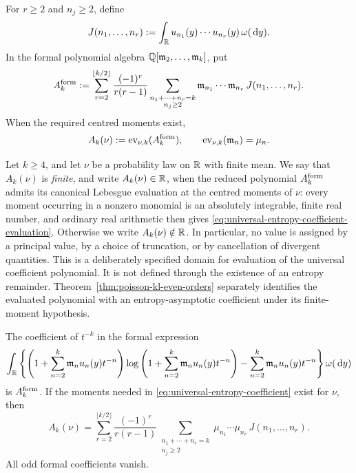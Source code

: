 For \(r\ge2\) and \(n_j\ge2\), define
\begin{equation}\label{eq:mode-integral-definition}
J(n_1,\ldots,n_r):=
\int_{\mathbb{R}}u_{n_1}(y)\cdots u_{n_r}(y)\,\omega(\,\mathrm{d} y).
\end{equation}
In the formal polynomial algebra
\(\mathbb{Q}[\mathfrak m_2,\ldots,\mathfrak m_k]\), put
\begin{equation}\label{eq:universal-entropy-coefficient}
A_k^{\rm form}:=
\sum_{r=2}^{\lfloor k/2\rfloor}
\frac{(-1)^r}{r(r-1)}
\sum_{\substack{n_1+\cdots+n_r=k\\ n_j\ge2}}
\mathfrak m_{n_1}\cdots\mathfrak m_{n_r}\,J(n_1,\ldots,n_r).
\end{equation}
When the required centred moments exist,
\begin{equation}\label{eq:universal-entropy-coefficient-evaluation}
A_k(\nu):=\operatorname{ev}_{\nu,k}(A_k^{\rm form}),
\qquad
\operatorname{ev}_{\nu,k}(\mathfrak m_n)=\mu_n .
\end{equation}

\begin{definition}
\label{def:canonical-coefficient-finiteness}
Let \(k\ge4\), and let \(\nu\) be a probability law on \(\mathbb{R}\) with finite
mean.  We say that \(A_k(\nu)\) is \emph{finite}, and write
\(A_k(\nu)\in\mathbb{R}\), when the reduced polynomial
\(A_k^{\rm form}\) admits its canonical Lebesgue evaluation at the centred
moments of \(\nu\): every moment occurring in a nonzero monomial is an
absolutely integrable, finite real number, and ordinary real arithmetic then
gives \eqref{eq:universal-entropy-coefficient-evaluation}.  Otherwise we
write \(A_k(\nu)\notin\mathbb{R}\).  In particular, no value is assigned by a
principal value, by a choice of truncation, or by cancellation of divergent
quantities.  This is a deliberately specified domain for evaluation of the
universal coefficient polynomial.  It is not defined through the existence
of an entropy remainder.  Theorem~\ref{thm:poisson-kl-even-orders} separately
identifies the evaluated polynomial with an entropy-asymptotic coefficient
under its finite-moment hypothesis.
\end{definition}

\begin{theorem}%
\label{thm:universal-entropy-coefficients}
The coefficient of \(t^{-k}\) in the formal expression
\[
\int_{\mathbb{R}}\left\{
\left(1+\sum_{n=2}^{k}\mathfrak m_nu_n(y)t^{-n}\right)
\log\left(1+\sum_{n=2}^{k}\mathfrak m_nu_n(y)t^{-n}\right)
-\sum_{n=2}^{k}\mathfrak m_nu_n(y)t^{-n}
\right\}\omega(\,\mathrm{d} y)
\]
is \(A_k^{\rm form}\).  If the moments needed in
\eqref{eq:universal-entropy-coefficient} exist for \(\nu\), then
\[
A_k(\nu)=
\sum_{r=2}^{\lfloor k/2\rfloor}
\frac{(-1)^r}{r(r-1)}
\sum_{\substack{n_1+\cdots+n_r=k\\ n_j\ge2}}
\mu_{n_1}\cdots\mu_{n_r}\,J(n_1,\ldots,n_r).
\]
All odd formal coefficients vanish.
\end{theorem}

